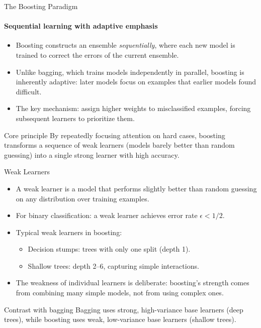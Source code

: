 \begin{frame}{The Boosting Paradigm}
  \framesubtitle{Sequential learning with adaptive emphasis}
  \begin{itemize}
    \item \alert{Boosting} constructs an ensemble \emph{sequentially}, where each new model
          is trained to correct the errors of the current ensemble.
    \item Unlike bagging, which trains models independently in parallel, boosting is inherently
          \alert{adaptive}: later models focus on examples that earlier models found difficult.
    \item The key mechanism: assign \alert{higher weights} to misclassified examples, forcing
          subsequent learners to prioritize them.
  \end{itemize}
  \begin{block}{Core principle}
    By repeatedly focusing attention on hard cases, boosting transforms a sequence of
    \alert{weak learners} (models barely better than random guessing) into a single
    \alert{strong learner} with high accuracy.
  \end{block}
\end{frame}

\begin{frame}{Weak Learners}
  \begin{itemize}
    \item A \alert{weak learner} is a model that performs slightly better than random guessing
          on any distribution over training examples.
    \item For binary classification: a weak learner achieves error rate $\epsilon < 1/2$.
    \item Typical weak learners in boosting:
      \begin{itemize}
        \item \alert{Decision stumps}: trees with only one split (depth 1).
        \item \alert{Shallow trees}: depth 2--6, capturing simple interactions.
      \end{itemize}
    \item The weakness of individual learners is \alert{deliberate}: boosting's strength comes
          from combining many simple models, not from using complex ones.
  \end{itemize}
  \begin{alertblock}{Contrast with bagging}
    Bagging uses \alert{strong, high-variance} base learners (deep trees), while boosting
    uses \alert{weak, low-variance} base learners (shallow trees).
  \end{alertblock}
\end{frame}

